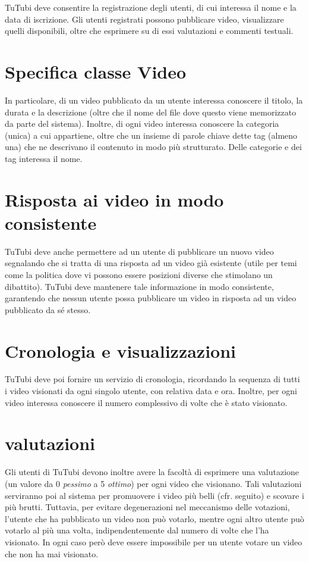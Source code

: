 \documentclass{article}
\begin{document}
    TuTubi deve consentire la registrazione degli utenti, di cui interessa il nome e la data
    di iscrizione. Gli utenti registrati possono pubblicare video, visualizzare quelli disponibili,
    oltre che esprimere su di essi valutazioni e commenti testuali.
    \section{Specifica classe Video}
    In particolare, di un video pubblicato da un utente interessa conoscere il titolo, la
    durata e la descrizione (oltre che il nome del file dove questo viene memorizzato da
    parte del sistema).
    Inoltre, di ogni video interessa conoscere la categoria (unica) a
    cui appartiene, oltre che un insieme di parole chiave dette tag (almeno una) che ne
    descrivano il contenuto in modo più strutturato. Delle categorie e dei tag interessa il
    nome.
    \section{Risposta ai video in modo consistente}
    TuTubi deve anche permettere ad un utente di pubblicare un nuovo video segnalando
    che si tratta di una risposta ad un video già esistente (utile per temi come la politica dove
    vi possono essere posizioni diverse che stimolano un dibattito). TuTubi deve mantenere
    tale informazione in modo consistente, garantendo che nessun utente possa pubblicare
    un video in risposta ad un video pubblicato da sé stesso.
    \section{Cronologia e visualizzazioni}
    TuTubi deve poi fornire un servizio di cronologia, ricordando la sequenza di tutti i
    video visionati da ogni singolo utente, con relativa data e ora. Inoltre, per ogni video
    interessa conoscere il numero complessivo di volte che è stato visionato.
    \section{valutazioni}
    Gli utenti di TuTubi devono inoltre avere la facoltà di esprimere una valutazione
    (un valore da 0 \emph{pessimo} a 5 \emph{ottimo}) per ogni video che visionano. Tali valutazioni
    serviranno poi al sistema per promuovere i video più belli (cfr. seguito) e scovare i più
    brutti. Tuttavia, per evitare degenerazioni nel meccanismo delle votazioni, l’utente che
    ha pubblicato un video non può votarlo, mentre ogni altro utente può votarlo al più una
    volta, indipendentemente dal numero di volte che l’ha visionato. In ogni caso però deve
    essere impossibile per un utente votare un video che non ha mai visionato.
\end{document}
